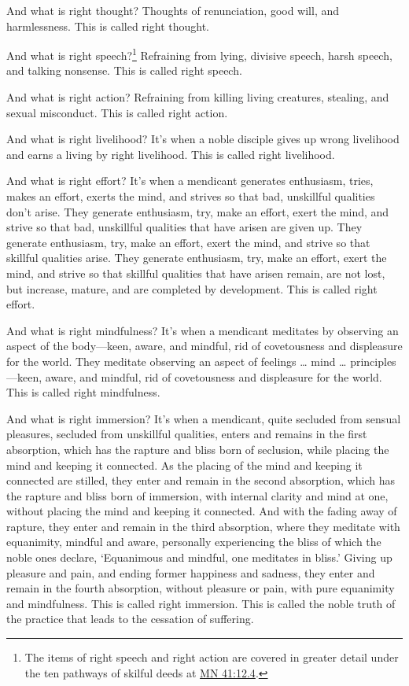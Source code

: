 \documentclass[12pt,openany]{book}%
\begin{document}
And what is right thought? Thoughts of renunciation, good will, and harmlessness. This is called right thought. 

And what is right speech?\footnote{The items of right speech and right action are covered in greater detail under the ten pathways of skilful deeds at \href{https://suttacentral.net/mn41/en/sujato\#12.4}{MN 41:12.4}. } Refraining from lying, divisive speech, harsh speech, and talking nonsense. This is called right speech. 

And what is right action? Refraining from killing living creatures, stealing, and sexual misconduct. This is called right action. 

And what is right livelihood? It’s when a noble disciple gives up wrong livelihood and earns a living by right livelihood. This is called right livelihood. 

And what is right effort? It’s when a mendicant generates enthusiasm, tries, makes an effort, exerts the mind, and strives so that bad, unskillful qualities don’t arise. They generate enthusiasm, try, make an effort, exert the mind, and strive so that bad, unskillful qualities that have arisen are given up. They generate enthusiasm, try, make an effort, exert the mind, and strive so that skillful qualities arise. They generate enthusiasm, try, make an effort, exert the mind, and strive so that skillful qualities that have arisen remain, are not lost, but increase, mature, and are completed by development. This is called right effort. 

And what is right mindfulness? It’s when a mendicant meditates by observing an aspect of the body—keen, aware, and mindful, rid of covetousness and displeasure for the world. They meditate observing an aspect of feelings … mind … principles—keen, aware, and mindful, rid of covetousness and displeasure for the world. This is called right mindfulness. 

And what is right immersion? It’s when a mendicant, quite secluded from sensual pleasures, secluded from unskillful qualities, enters and remains in the first absorption, which has the rapture and bliss born of seclusion, while placing the mind and keeping it connected. As the placing of the mind and keeping it connected are stilled, they enter and remain in the second absorption, which has the rapture and bliss born of immersion, with internal clarity and mind at one, without placing the mind and keeping it connected. And with the fading away of rapture, they enter and remain in the third absorption, where they meditate with equanimity, mindful and aware, personally experiencing the bliss of which the noble ones declare, ‘Equanimous and mindful, one meditates in bliss.’ Giving up pleasure and pain, and ending former happiness and sadness, they enter and remain in the fourth absorption, without pleasure or pain, with pure equanimity and mindfulness. This is called right immersion. This is called the noble truth of the practice that leads to the cessation of suffering. 
\end{document}
